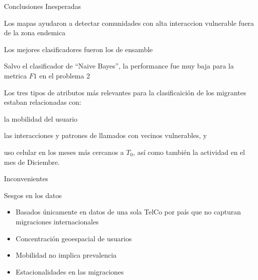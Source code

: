 \documentclass[xcolor=x11names]{beamer}
\begin{document}
\begin{frame}{Conclusiones Inesperadas}

	Los mapas ayudaron a detectar comunidades con alta interaccion vulnerable fuera de la zona endemica
	
	\medskip

	Los mejores clasificadores fueron los de ensamble

	\medskip
	Salvo el clasificador de ``Naive Bayes'', la performance fue muy baja para la metrica $F1$ en el problema 2

	\medskip
	Los tres tipos de atributos más relevantes para la clasificaición de los migrantes estaban relacionadas con:

	\begin{enumerate*}[label={\alph*)},]
		\item la mobilidad del usuario
		\item las interacciones y patrones de llamados con vecinos vulnerables, y
		\item uso celular en los meses más cercanos a $T_0$, así como también la actividad en el mes de Diciembre.
	\end{enumerate*}

\end{frame}


\begin{frame}{Inconvenientes}

		\begin{block}{Sesgos en los datos}
			\begin{itemize}
			\item Basados únicamente en datos de una sola TelCo por país que no capturan migraciones internacionales
			\item Concentración geoespacial de usuarios

			\item Mobilidad no implica prevalencia

			\item Estacionalidades en las migraciones

			\end{itemize}
 	 	\end{block}
\end{frame}
\end{document}
